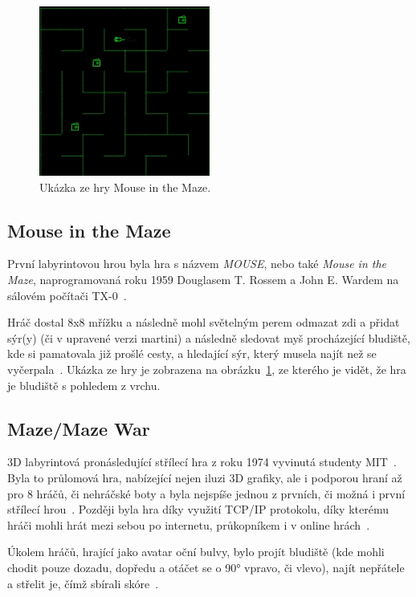 \begin{figure}[H]
	\centering
	\includegraphics[width=0.5\textwidth]{obrazky-figures/ch2/MOUSE.png}
	\caption{Ukázka ze hry Mouse in the Maze.~\cite{Videogamehistorian}}
	\label{fig:mouse}
\end{figure}

\subsection*{Mouse in the Maze}
První labyrintovou hrou byla hra s názvem \textit{MOUSE}, nebo také \textit{Mouse in the Maze}, naprogramovaná roku 1959  Douglasem T. Rossem a John E. Wardem na sálovém počítači TX-0~\cite{TheOriginOfSpacewar}. 

Hráč dostal 8x8 mřížku a následně mohl světelným perem odmazat zdi a přidat sýr(y) (či v upravené verzi martini) a následně sledovat myš procházející bludiště, kde si pamatovala již prošlé cesty, a hledající sýr, který musela najít než se vyčerpala~\cite{Videogamehistorian}. Ukázka ze hry je zobrazena na obrázku~\ref{fig:mouse}, ze kterého je vidět, že hra je bludiště s pohledem z vrchu.

\subsection*{Maze/Maze War}
3D labyrintová pronásledující střílecí hra z roku 1974 vyvinutá studenty MIT~\cite{Maze_War}. Byla to průlomová hra, nabízející nejen iluzi 3D grafiky, ale i podporou hraní až pro 8 hráčů, či nehráčské boty a byla nejspíše jednou z prvních, či možná i první střílecí hrou~\cite{virtual_worlds}. Později byla hra díky využití TCP/IP protokolu, díky kterému hráči mohli hrát mezi sebou po internetu, průkopníkem i v online hrách~\cite{Maze_War}.

Úkolem hráčů, hrající jako avatar oční bulvy, bylo projít bludiště (kde mohli chodit pouze dozadu, dopředu a otáčet se o 90° vpravo, či vlevo), najít nepřátele a střelit je, čímž sbírali skóre~\cite{Maze_War}.

